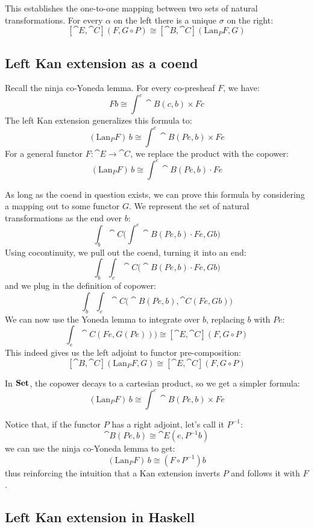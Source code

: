 \documentclass[DaoFP]{subfiles}
\begin{document}
This establishes the one-to-one mapping between two sets of natural transformations. For every $\alpha$ on the left there is a unique $\sigma$ on the right:
\[  [\cat E, \cat C] (F, G \circ P) \cong [\cat B, \cat C](\text{Lan}_P F , G)  \]


\subsection{Left Kan extension as a coend}

Recall the ninja co-Yoneda lemma. For every co-presheaf $F$, we have:
\[ F b \cong \int^{c} \cat B(c, b) \times F c \]
The left Kan extension generalizes this formula to:
\[ (\text{Lan}_P F)\, b \cong \int^{e} \cat B (P e, b) \times F e \]
For a general functor $F \colon \cat E \to \cat C$, we replace the product with the copower:
\[ (\text{Lan}_P F)\, b \cong \int^{e} \cat B(P e, b) \cdot F e \]

As long as the coend in question exists, we can prove this formula by considering a mapping out to some functor $G$. We represent the set of natural transformations as the end over $b$:
\[\int_b \cat C \big(\int^e \cat B(P e, b) \cdot F e, G b\big) \]
Using cocontinuity, we pull out the coend, turning it into an end:
\[\int_b \int_e \cat C \big(\cat B(P e, b) \cdot F e, G b\big) \]
and we plug in the definition of copower:
\[\int_b \int_e \cat C \big(\cat B(P e, b), \cat C (F e, G b)\big) \]
We can now use the Yoneda lemma to integrate over $b$, replacing $b$ with $P e$:
\[\int_e \cat C (F e, G (P e))\big) \cong  [\cat E, \cat C] (F, G \circ P) \]
This indeed gives us the left adjoint to functor pre-composition:
\[ [\cat B, \cat C](\text{Lan}_P F , G) \cong  [\cat E, \cat C] (F, G \circ P) \]

In $\mathbf{Set}$, the copower decays to a cartesian product, so we get a simpler formula:
\[ (\text{Lan}_P F)\, b \cong \int^{e} \cat B (P e, b) \times F e \]

 Notice that, if the functor $P$ has a right adjoint, let's call it $P^{-1}$:
 \[ \cat B(P e , b) \cong \cat E(e, P^{-1} b) \]
 we can use the ninja co-Yoneda lemma to get:
 \[  (\text{Lan}_P F)\, b \cong (F \circ P^{-1}) b \]
 thus reinforcing the intuition that a Kan extension inverts $P$ and follows it with $F$.
 
\subsection{Left Kan extension in Haskell}
\end{document}
